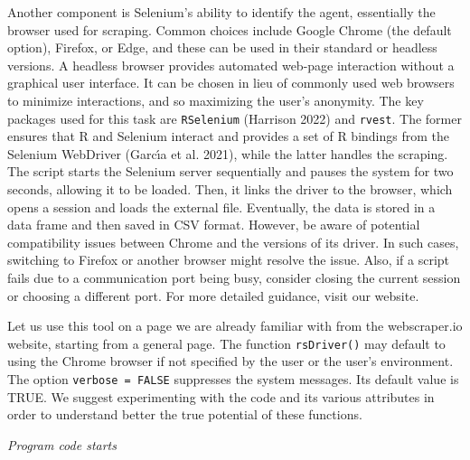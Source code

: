 Another component is Selenium's ability to identify the agent,
essentially the browser used for scraping. Common choices include Google
Chrome (the default option), Firefox, or Edge, and these can be used in
their standard or headless versions. A headless browser provides
automated web-page interaction without a graphical user interface. It
can be chosen in lieu of commonly used web browsers to minimize
interactions, and so maximizing the user's anonymity. The key packages used for
this task are \texttt{RSelenium} (Harrison 2022) and \texttt{rvest}. The
former ensures that R and Selenium interact and provides a set
of R bindings from the Selenium WebDriver (Garcı́a et al. 2021), while
the latter handles the scraping. The script starts the
Selenium server sequentially and pauses the system for two seconds, allowing it to be
loaded. Then, it links the driver to the browser, which opens a session and loads the external file. Eventually, the data is
stored in a data frame and then saved in CSV format. However, be aware
of potential compatibility issues between Chrome and the versions of its driver.
In such cases, switching to Firefox or another browser might resolve the
issue. Also, if a script fails due to a communication port being busy,
consider closing the current session or choosing a different
port. For more detailed guidance, visit our website.

Let us use this tool on a page we are already familiar with from the
webscraper.io website, starting from a general page. The function
\texttt{rsDriver()} may default to using the Chrome browser if not
specified by the user or the user's environment. The option
\texttt{verbose\ =\ FALSE} suppresses the system messages. Its default
value is TRUE. We suggest experimenting with the code and its various
attributes in order to understand better the true potential of these
functions.

\emph{Program code starts}


